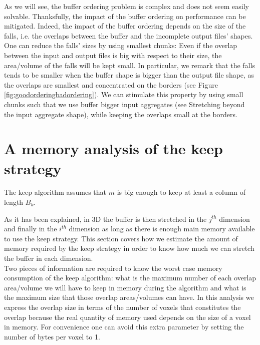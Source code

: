 \documentclass[conference]{IEEEtran}
\begin{document}
As we will see, the buffer ordering problem is complex and does not seem easily solvable.
Thanksfully, the impact of the buffer ordering on performance can be mitigated.
Indeed, the impact of the buffer ordering depends on the size of the falls, i.e. the overlaps between the buffer and the incomplete output files' shapes.
One can reduce the falls' sizes by using smallest chunks:
Even if the overlap between the input and output files is big with respect to their size, the area/volume of the falls will be kept small.
In particular, we remark that the falls tends to be smaller when the buffer shape is bigger than the output file shape, as the overlaps are smallest and concentrated on the borders (see Figure \ref{fig:goodorderingbadordering}).
We can stimulate this property by using small chunks such that we use buffer bigger input aggregates (see Stretching beyond the input aggregate shape), while keeping the overlaps small at the borders.

\section*{A memory analysis of the keep strategy}
The keep algorithm assumes that $m$ is big enough to keep at least a column of length $B_k$. %

As it has been explained, in 3D the buffer is then stretched in the $j^{th}$ dimension and finally in the $i^{th}$ dimension as long as there is enough main memory available to use the keep strategy.
This section covers how we estimate the amount of memory required by the keep strategy in order to know how much we can stretch the buffer in each dimension. \\

Two pieces of information are required to know the worst case memory consumption of the keep algorithm: what is the maximum number of each overlap area/volume we will have to keep in memory during the algorithm and what is the maximum size that those overlap areas/volumes can have.
In this analysis we express the overlap size in terms of the number of voxels that constitutes the overlap because the real quantity of memory used depends on the size of a voxel in memory.
For convenience one can avoid this extra parameter by setting the number of bytes per voxel to 1.
\end{document}
